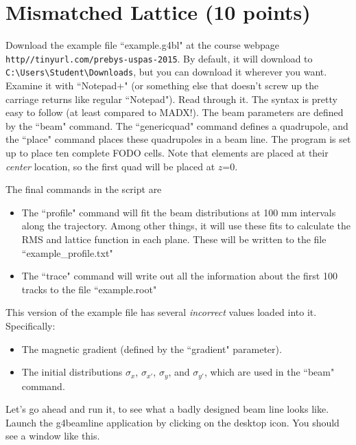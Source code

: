 \documentclass{article}
\begin{document}
\section{Mismatched Lattice (10 points)}

Download the example file ``example.g4bl" at the course webpage \verb+http//tinyurl.com/prebys-uspas-2015+.
By default, it will download to \verb+C:\Users\Student\Downloads+, but you can download it wherever you want.
Examine it with ``Notepad+" (or something else that doesn't screw up the carriage returns like regular ``Notepad").  Read through it.  The syntax is pretty easy to follow (at least compared to MADX!).  
The beam parameters are defined by the ``beam" command.  The ``genericquad" command defines a quadrupole, and the
``place" command places these quadrupoles in a beam line.  The program is set up to place ten complete FODO cells.
Note that elements are placed at their {\em center} location, so the first quad will be placed at $z$=0.

The final commands in the script are
\begin{itemize}
\item The ``profile" command will fit the beam distributions at 100 mm intervals along the trajectory.  Among other things, it will use these fits to calculate the RMS and lattice function in each plane.  These will be written to the file  ``example\_profile.txt"
\item The ``trace" command will write out all the information about the first 100 tracks to the file ``example.root"
\end{itemize}

This version of the example file has several {\em incorrect} values loaded into it.  Specifically:
\begin{itemize}
\item The magnetic gradient (defined by the ``gradient" parameter).
\item The initial distributions $\sigma_x$, $\sigma_{x'}$, $\sigma_y$, and $\sigma_{y'}$, which are used in the ``beam" command.
\end{itemize}

Let's go ahead and run it, to see what a badly designed beam line looks like.  Launch the g4beamline application by clicking on the desktop icon.  You should see a window like this.
\end{document}
